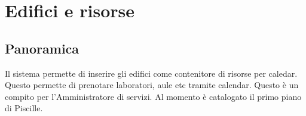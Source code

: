 \chapter{Edifici e risorse}
\section{Panoramica}
Il sistema permette di inserire gli edifici come contenitore di risorse per caledar.
Questo permette di prenotare laboratori, aule etc tramite calendar.
Questo è un compito per l'Amministratore di servizi. Al momento è catalogato il primo piano di Piscille.

